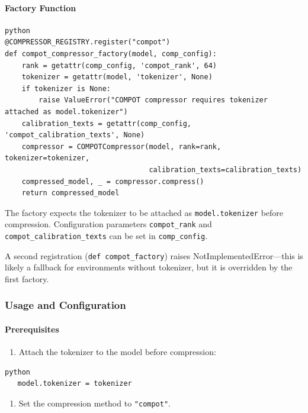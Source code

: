\paragraph{Factory Function}

\vspace{0.5em}
\begin{mdframed}[backgroundcolor=codebg, linecolor=codeframe, linewidth=1pt, roundcorner=4pt, innerleftmargin=2pt, innerrightmargin=5pt, innertopmargin=5pt, innerbottommargin=5pt]
\begin{lstlisting}
python
@COMPRESSOR_REGISTRY.register("compot")
def compot_compressor_factory(model, comp_config):
    rank = getattr(comp_config, 'compot_rank', 64)
    tokenizer = getattr(model, 'tokenizer', None)
    if tokenizer is None:
        raise ValueError("COMPOT compressor requires tokenizer attached as model.tokenizer")
    calibration_texts = getattr(comp_config, 'compot_calibration_texts', None)
    compressor = COMPOTCompressor(model, rank=rank, tokenizer=tokenizer,
                                  calibration_texts=calibration_texts)
    compressed_model, _ = compressor.compress()
    return compressed_model
\end{lstlisting}
\end{mdframed}
\vspace{0.5em}

The factory expects the tokenizer to be attached as \texttt{model.tokenizer} before compression. Configuration parameters \texttt{compot\_rank} and \texttt{compot\_calibration\_texts} can be set in \texttt{comp\_config}.

A second registration (\texttt{def compot\_factory}) raises NotImplementedError---this is likely a fallback for environments without tokenizer, but it is overridden by the first factory.


\subsubsection*{Usage and Configuration}

\paragraph{Prerequisites}

\begin{enumerate}
\item Attach the tokenizer to the model before compression:
\end{enumerate}
\vspace{0.5em}
\begin{mdframed}[backgroundcolor=codebg, linecolor=codeframe, linewidth=1pt, roundcorner=4pt, innerleftmargin=2pt, innerrightmargin=5pt, innertopmargin=5pt, innerbottommargin=5pt]
\begin{lstlisting}
python
   model.tokenizer = tokenizer
\end{lstlisting}
\end{mdframed}
\vspace{0.5em}
\begin{enumerate}
\item Set the compression method to \texttt{"compot"}.

\end{enumerate}
